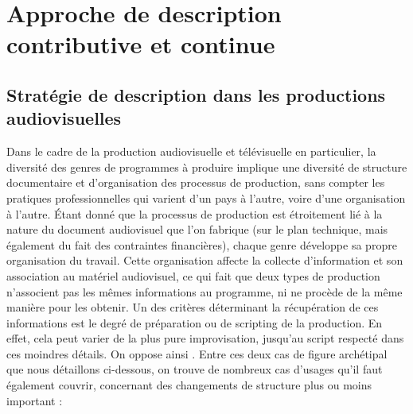 


\section{Approche de description contributive et continue}\label{sec:approche}

\subsection{Stratégie de description dans les productions audiovisuelles}\label{sec:strat-desc}
Dans le cadre de la production audiovisuelle et télévisuelle en particulier, la diversité des genres de programmes à produire implique une diversité de structure documentaire et d'organisation des processus de production, sans compter les pratiques professionnelles qui varient d'un pays à l'autre, voire d'une organisation à l'autre. 
Étant donné que la processus de production est étroitement lié à la nature du document audiovisuel que l'on fabrique (sur le plan technique, mais également du fait des contraintes financières), chaque genre développe sa propre organisation du travail.
Cette organisation affecte la collecte d'information et son association au matériel audiovisuel, ce qui fait que deux types de production n'associent pas les mêmes informations au programme, ni ne procède de la même manière pour les obtenir.
Un des critères déterminant la récupération de ces informations est le degré de préparation ou de scripting de la production.
En effet, cela peut varier de la plus pure improvisation, jusqu'au script respecté dans ces moindres détails. On oppose ainsi .
Entre ces deux cas de figure archétipal que nous détaillons ci-dessous, on trouve de nombreux cas d'usages qu'il faut également couvrir, concernant des changements de structure plus ou moins important : 

